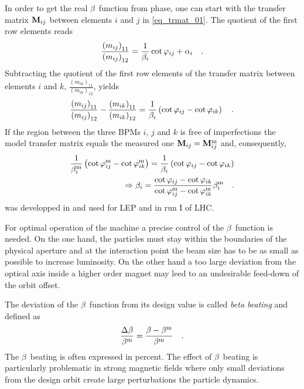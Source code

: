 In order to get the real $\beta$~function from phase, one can start with the transfer matrix $\mathbf{M}_{ij}$
between elements $i$ and $j$ in \eqref{eq_trmat_01}.
The quotient of the first row elements reads 
%
\begin{equation}
    \frac{\left(m_{ij}\right)_{11}}{\left(m_{ij}\right)_{12}} =
    \frac{1}{\beta_i} \cot\varphi_{ij} + \alpha_i
    \quad .
    \label{eq_trmat_quot}
\end{equation}
%
Subtracting the quotient of the first row elements of the transfer matrix between elements $i$ and $k$,
$ \frac{\left(m_{ik}\right)_{11}}{\left(m_{ik}\right)_{12}}$, yields
%
\begin{equation}
    \frac{\left(m_{ij}\right)_{11}}{\left(m_{ij}\right)_{12}} - \frac{\left(m_{ik}\right)_{11}}{\left(m_{ik}\right)_{12}}
    =
    \frac{1}{\beta_i} \left( \cot\varphi_{ij} - \cot\varphi_{ik}\right)
    \quad .
\end{equation}
%
If the region between the three BPMs $i$, $j$ and $k$ is free of imperfections
the model transfer matrix equals the measured one
$\mathbf{M}_{ij} = \mathbf{M}_{ij}^\text{m}$ and, consequently,
%
\begin{align}
    \frac{1}{\beta_i^\text{m}} \left( \cot\varphi_{ij}^\text{m} - \cot \varphi_{ik}^\text{m} \right)
    =
    \frac{1}{\beta_i} \left( \cot\varphi_{ij} - \cot \varphi_{ik} \right) \notag \\
    \Rightarrow
    \beta_i = \frac{
        \cot\varphi_{ij} - \cot\varphi_{ik}
    }{
        \cot\varphi_{ij}^\text{m} - \cot\varphi_{ik}^\text{m}
    }
    \beta_i^\text{m}
    \quad .
    \label{eq_3bpm_method}
\end{align}
%
 was developped in \cite{Castro1996} and used for LEP and in run I of LHC.

For optimal operation of the machine a precise control of the $\beta$~function is needed. On the one
hand, the particles must stay within the boundaries of the physical aperture and 
at the interaction point the beam size has to be as small as possible to increase luminosity.
On the other hand a too large deviation from the optical axis inside a higher order magnet may leed to an undesirable
feed-down of the orbit offset.

The deviation of the $\beta$~function from its design value is called \emph{beta beating} and defined as 
%
\begin{equation}
    \frac{\Delta\beta}{\beta^\text{m}} = \frac{\beta - \beta^\text{m}}{\beta^\text{m}}
    \label{eq_def_beta_beat}
    \quad .
\end{equation}
%
The $\beta$~beating is often expressed in percent.
The effect of $\beta$~beating is particularly problematic in strong magnetic fields where only small
deviations from the design orbit create large perturbations the particle dynamics.

